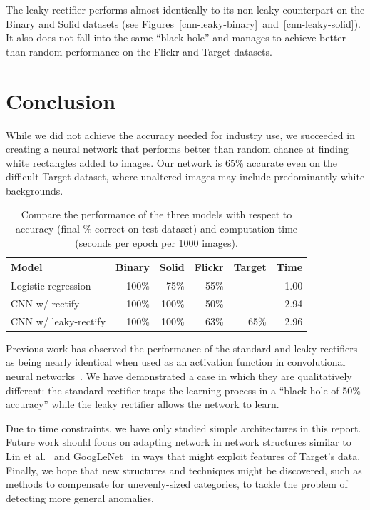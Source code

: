 \documentclass{article}
\newcommand{\dataset}[1]{\textsf{#1}}
\begin{document}
    The leaky rectifier performs almost identically to its non-leaky counterpart on the \dataset{Binary} and \dataset{Solid} datasets (see Figures~\ref{cnn-leaky-binary}~and~\ref{cnn-leaky-solid}). It also does not fall into the same ``black hole'' and manages to achieve better-than-random performance on the \dataset{Flickr} and \dataset{Target} datasets.


\section{Conclusion}

  While we did not achieve the accuracy needed for industry use, we succeeded in creating a neural network that performs better than random chance at finding white rectangles added to images. Our network is 65\% accurate even on the difficult Target dataset, where unaltered images may include predominantly white backgrounds.

  \begin{table}[ht]
    \centering
    \begin{tabular}{lrrrrr}\toprule
      \textbf{Model} & \textbf{\dataset{Binary}} & \textbf{\dataset{Solid}} & \textbf{\dataset{Flickr}} & \textbf{\dataset{Target}} & \textbf{Time}\\\midrule
      Logistic regression  & 100\% &  75\% &  55\% &  --- & 1.00 \\
      CNN w/ rectify       & 100\% & 100\% &  50\% &  --- & 2.94 \\
      CNN w/ leaky-rectify & 100\% & 100\% &  63\% & 65\% & 2.96 \\ \bottomrule
    \end{tabular}
    \caption{Compare the performance of the three models with respect to accuracy (final \% correct on test dataset) and computation time (seconds per epoch per 1000 images). }
  \end{table}

  Previous work has observed the performance of the standard and leaky rectifiers as being nearly identical when used as an activation function in convolutional neural networks~\cite{leakyrectify}. We have demonstrated a case in which they are qualitatively different: the standard rectifier traps the learning process in a ``black hole of 50\% accuracy'' while the leaky rectifier allows the network to learn.

  Due to time constraints, we have only studied simple architectures in this report. Future work should focus on adapting network in network structures similar to Lin et al.~\cite{NIN} and GoogLeNet~\cite{GDWC} in ways that might exploit features of Target's data. Finally, we hope that new structures and techniques might be discovered, such as methods to compensate for unevenly-sized categories, to tackle the problem of detecting more general anomalies.
\end{document}
